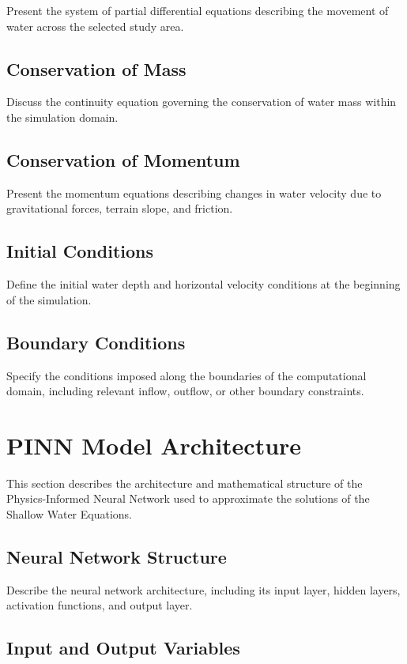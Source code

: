 Present the system of partial differential equations describing the movement of water across the selected study area.

\subsection{Conservation of Mass}

Discuss the continuity equation governing the conservation of water mass within the simulation domain.

\subsection{Conservation of Momentum}

Present the momentum equations describing changes in water velocity due to gravitational forces, terrain slope, and friction.

\subsection{Initial Conditions}

Define the initial water depth and horizontal velocity conditions at the beginning of the simulation.

\subsection{Boundary Conditions}

Specify the conditions imposed along the boundaries of the computational domain, including relevant inflow, outflow, or other boundary constraints.

\section{PINN Model Architecture}

This section describes the architecture and mathematical structure of the Physics-Informed Neural Network used to approximate the solutions of the Shallow Water Equations.

\subsection{Neural Network Structure}

Describe the neural network architecture, including its input layer, hidden layers, activation functions, and output layer.

\subsection{Input and Output Variables}

